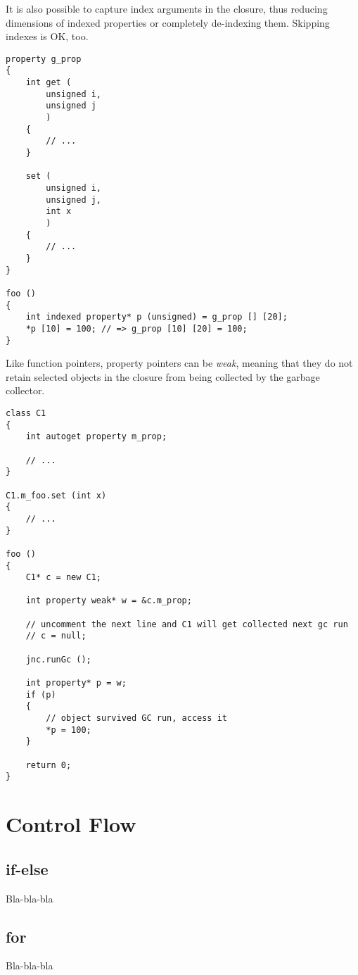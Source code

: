 \documentclass[oneside]{book}
\begin{document}
It is also possible to capture index arguments in the closure, thus reducing dimensions of indexed properties or completely de-indexing them. Skipping indexes is OK, too.

\begin{lstlisting}
property g_prop 
{
    int get (
        unsigned i,
        unsigned j
        )
    {
        // ...
    }

    set (
        unsigned i,
        unsigned j,
        int x
        )
    {
        // ...
    }
}

foo ()
{
    int indexed property* p (unsigned) = g_prop [] [20];
    *p [10] = 100; // => g_prop [10] [20] = 100;
}
\end{lstlisting}

Like function pointers, property pointers can be \emph{weak}, meaning that they do not retain selected objects in the closure from being collected by the garbage collector.

\begin{lstlisting}
class C1
{
    int autoget property m_prop;

    // ...
}

C1.m_foo.set (int x)
{
    // ...
}

foo ()
{
    C1* c = new C1;

    int property weak* w = &c.m_prop;

    // uncomment the next line and C1 will get collected next gc run
    // c = null;
    
    jnc.runGc ();

    int property* p = w;
    if (p)
    {
        // object survived GC run, access it
        *p = 100;
    }

    return 0;
}
\end{lstlisting}

\section{Control Flow}
\subsection{if-else}

Bla-bla-bla

\subsection{for}

Bla-bla-bla
\end{document}
